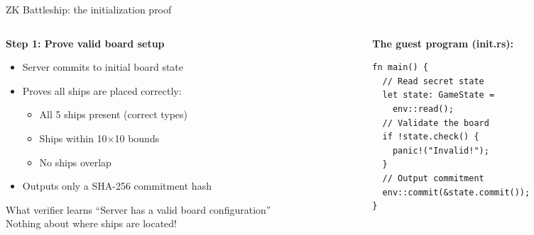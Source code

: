 \ifdefined\PRESENTATION\else\PassOptionsToClass{handout}{beamer}\fi\documentclass[aspectratio=169, lualatex]{beamer}
\begin{document}
\begin{frame}[fragile]{ZK Battleship: the initialization proof}
	\begin{columns}[c]
		\begin{column}{0.55\textwidth}
			\textbf{Step 1: Prove valid board setup}
			\begin{itemize}
				\item Server commits to initial board state
				\item Proves all ships are placed correctly:
				      \begin{itemize}
					      \item All 5 ships present (correct types)
					      \item Ships within 10$\times$10 bounds
					      \item No ships overlap
				      \end{itemize}
				\item Outputs only a SHA-256 commitment hash
			\end{itemize}
			\begin{exampleblock}{What verifier learns}
				``Server has a valid board configuration''\\
				Nothing about where ships are located!
			\end{exampleblock}
		\end{column}
		\begin{column}{0.45\textwidth}
			\textbf{The guest program (init.rs):}
			\begin{verbatim}
fn main() {
  // Read secret state
  let state: GameState =
    env::read();
  // Validate the board
  if !state.check() {
    panic!("Invalid!");
  }
  // Output commitment
  env::commit(&state.commit());
}
\end{verbatim}
		\end{column}
	\end{columns}
\end{frame}
\end{document}
